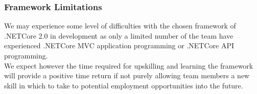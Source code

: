 \documentclass{article}
\begin{document}
            \subsubsection{Framework Limitations}
                We may experience some level of difficulties with the chosen framework of .NETCore 2.0 in development
                as only a limited number of the team have experienced .NETCore MVC application programming or 
                .NETCore API programming. 
                \\
                We expect however the time required for upskilling and learning the framework will provide a positive
                time return if not purely allowing team members a new skill in which to take to potential employment 
                opportunities into the future.
        
        \newpage
\end{document}
